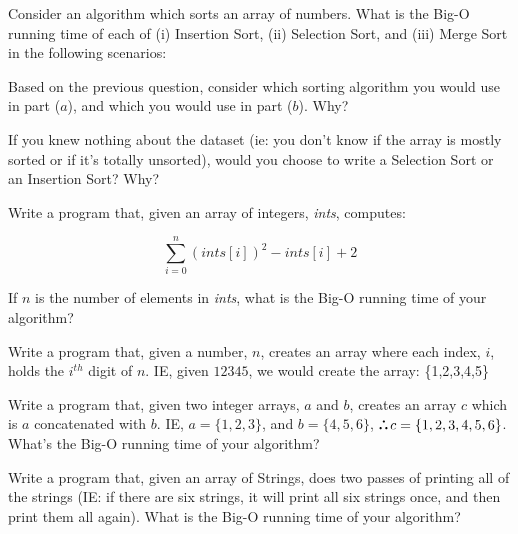 \documentclass[answers]{exam}
\date{\duedate}
\def\therefore{\boldsymbol{\text{ }
\leavevmode
\lower0.4ex\hbox{$\cdot$}
\kern-.5em\raise0.7ex\hbox{$\cdot$}
\kern-0.55em\lower0.4ex\hbox{$\cdot$}
\thinspace\text{ }}}
\begin{document}
\pagebreak

\begin{questions}

    \question Consider an algorithm which sorts an array of numbers. What is the Big-O running time of each of (i) Insertion Sort, (ii) Selection Sort, and (iii) Merge Sort in the following scenarios:
    	
    \question Based on the previous question, consider which sorting algorithm you would use in part ($a$), and which you would use in part ($b$). Why?
    
    \question If you knew nothing about the dataset (ie: you don't know if the array is mostly sorted or if it's totally unsorted), would you choose to write a Selection Sort or an Insertion Sort? Why? 
    
    \question Write a program that, given an array of integers, \textit{ints}, computes:
    
    $$\sum_{i=0}^{n}{(ints[i])^2 - ints[i] + 2}$$ 

	If $n$ is the number of elements in \textit{ints}, what is the Big-O running time of your algorithm?    
    
	\question Write a program that, given a number, $n$, creates an array where each index, $i$, holds the $i^{th}$ digit of $n$. IE, given $12345$, we would create the array: \{1,2,3,4,5\}    
	
	\question Write a program that, given two integer arrays, $a$ and $b$, creates an array $c$ which is $a$ concatenated with $b$. IE, $a =  \{1,2,3\}$, and $b = \{4,5,6\}$, $\therefore c =  \{1,2,3,4,5,6\}$. What's the Big-O running time of your algorithm?
	
	\question Write a program that, given an array of Strings, does two passes of printing all of the strings (IE: if there are six strings, it will print all six strings once, and then print them all again). What is the Big-O running time of your algorithm?	
	

\end{questions}
\end{document}
